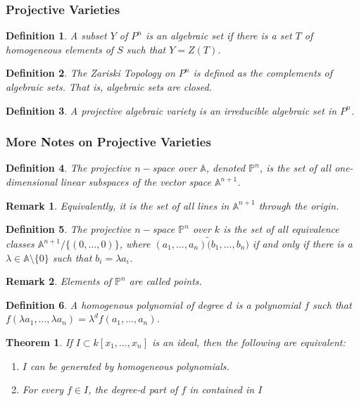 \documentclass[oneside]{book}
\theoremstyle{mystyle}
\newtheorem{theorem}{Theorem}[section]
\newtheorem{definition}{Definition}[section]
\newtheorem{remark}{Remark}[section]
\begin{document}
\subsubsection{Projective Varieties}
\begin{definition}
A subset $Y$ of $P^n$ is an algebraic set if there is a set $T$ of homogeneous elements of $S$ such that $Y=Z(T)$.
\end{definition}
\begin{definition}
The Zariski Topology on $P^n$ is defined as the complements of algebraic sets. That is, algebraic sets are closed.
\end{definition}
\begin{definition}
A projective algebraic variety is an irreducible algebraic set in $P^n$.
\end{definition}
\subsubsection{More Notes on Projective Varieties}
\begin{definition}
The projective $n-$space over $\mathbb{A}$, denoted $\mathbb{P}^n$, is the set of all one-dimensional linear subspaces of the vector space $\mathbb{A}^{n+1}$.
\end{definition}
\begin{remark}
Equivalently, it is the set of all lines in $\mathbb{A}^{n+1}$ through the origin.
\end{remark}
\begin{definition}
The projective $n-$space $\mathbb{P}^n$ over $k$ is the set of all equivalence classes $\mathbb{A}^{n+1}/\{(0,\hdots, 0)\}$, where $(a_1,\hdots, a_n)\tilde (b_1,\hdots, b_n)$ if and only if there is a $\lambda \in \mathbb{A}\setminus \{0\}$ such that $b_i = \lambda a_i$.
\end{definition}
\begin{remark}
Elements of $\mathbb{P}^n$ are called points.
\end{remark}
\begin{definition}
A homogenous polynomial of degree $d$ is a polynomial $f$ such that $f(\lambda a_1,\hdots, \lambda a_n) = \lambda^d f(a_1,\hdots, a_n)$.
\end{definition}
\begin{theorem}
If $I\subset k[x_1,\hdots ,x_n]$ is an ideal, then the following are equivalent:
\begin{enumerate}
    \item $I$ can be generated by homogeneous polynomials.
    \item For every $f\in I$, the degree-$d$ part of $f$ in contained in $I$
\end{enumerate}
\end{theorem}
\end{document}
